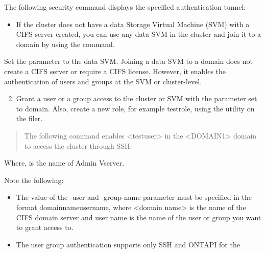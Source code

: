 \documentclass[letterpaper,10pt,english]{sphinxmanual}
\begin{document}

The following security command displays the specified authentication tunnel:

\begin{itemize}
\item {} 
If the cluster does not have a data Storage Virtual Machine (SVM) with a CIFS server created, you can use any data SVM in the cluster and join it to a domain by using the  command.

\end{itemize}

Set the  parameter to the data SVM. Joining a data SVM to a domain does not create a CIFS server or require a CIFS license. However, it enables the authentication of users and groups at the SVM or cluster-level.
\begin{enumerate}
\setcounter{enumi}{1}
\item {} 
Grant a user or a group access to the cluster or SVM with the  parameter set to domain. Also, create a new role, for example testrole, using the  utility on the filer.

\end{enumerate}
\begin{quote}

The following command enables \textless{}testuser\textgreater{} in the \textless{}DOMAIN1\textgreater{} domain to access the cluster through SSH:

\end{quote}

Where,  is the name of Admin Vserver.

Note the following:
\begin{itemize}
\item {} 
The value of the -user and -group-name parameter must be specified in the format domainnameusername, where \textless{}domain name\textgreater{} is the name of the CIFS domain server and user name is the name of the user or group you want to grant access to.

\item {} 
The user group authentication supports only SSH and ONTAPI for the

\end{itemize}
\end{document}
